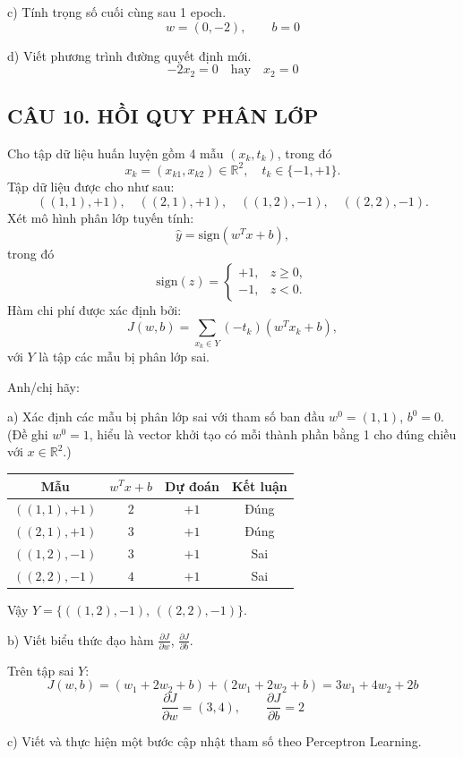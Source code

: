\documentclass[a4paper,12pt]{article}
\begin{document}
c) Tính trọng số cuối cùng sau 1 epoch.
\[ w = (0, -2), \qquad b = 0 \]

d) Viết phương trình đường quyết định mới.
\[ -2x_2 = 0 \quad \text{hay} \quad x_2 = 0 \]

\subsection*{CÂU 10. HỒI QUY PHÂN LỚP}

Cho tập dữ liệu huấn luyện gồm 4 mẫu $(x_k, t_k)$, trong đó
\[ x_k = (x_{k1}, x_{k2}) \in \mathbb{R}^2, \quad t_k \in \{-1, +1\}. \]
Tập dữ liệu được cho như sau:
\[ ((1, 1), +1), \quad ((2, 1), +1), \quad ((1, 2), -1), \quad ((2, 2), -1). \]
Xét mô hình phân lớp tuyến tính:
\[ \hat{y} = \text{sign}(w^T x + b), \]
trong đó
\[ \text{sign}(z) = \begin{cases}
+1, & z \geq 0, \\
-1, & z < 0.
\end{cases} \]
Hàm chi phí được xác định bởi:
\[ J(w, b) = \sum_{x_k \in Y} (-t_k)(w^T x_k + b), \]
với $Y$ là tập các mẫu bị phân lớp sai.

Anh/chị hãy:

a) Xác định các mẫu bị phân lớp sai với tham số ban đầu $w^0 = (1, 1)$, $b^0 = 0$.
(Đề ghi $w^0 = 1$, hiểu là vector khởi tạo có mỗi thành phần bằng 1 cho đúng chiều với $x \in \mathbb{R}^2$.)

\begin{center}
\begin{tabular}{|c|c|c|c|}
\hline
Mẫu & $w^T x + b$ & Dự đoán & Kết luận \\
\hline
$((1,1), +1)$ & $2$ & $+1$ & Đúng \\
$((2,1), +1)$ & $3$ & $+1$ & Đúng \\
$((1,2), -1)$ & $3$ & $+1$ & Sai \\
$((2,2), -1)$ & $4$ & $+1$ & Sai \\
\hline
\end{tabular}
\end{center}
Vậy $Y = \{((1,2), -1),\, ((2,2), -1)\}$.

b) Viết biểu thức đạo hàm $\frac{\partial J}{\partial w}$,
$\frac{\partial J}{\partial b}$.

Trên tập sai $Y$:
\[ J(w, b) = (w_1 + 2w_2 + b) + (2w_1 + 2w_2 + b) = 3w_1 + 4w_2 + 2b \]
\[ \frac{\partial J}{\partial w} = (3, 4), \qquad \frac{\partial J}{\partial b} = 2 \]

c) Viết và thực hiện một bước cập nhật tham số theo Perceptron Learning.
\end{document}
